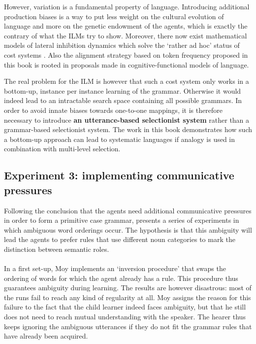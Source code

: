 However, variation is a fundamental property of language. Introducing  additional production biases is a way to put less weight on the cultural evolution of language and more on the genetic endowment of the agents, which is exactly the contrary of what the ILMs try to show. Moreover, there now exist mathematical models of lateral inhibition dynamics which solve the `rather ad hoc' status of cost systems \citep{baronchelli06sharp, devylder07evolution}. Also the alignment strategy based on token frequency proposed in this book is rooted in proposals made in cognitive-functional models of language.

The real problem for the ILM is however that such a cost system only works in a bottom-up, instance per instance learning of the grammar. Otherwise it would indeed lead to an intractable search space containing all possible grammars. In order to avoid innate biases towards one-to-one mappings, it is therefore necessary to introduce {\bfseries an utterance-based selectionist system} rather than a grammar-based selectionist system. The work in this book demonstrates how such a bottom-up approach can lead to systematic languages if analogy is used in combination with multi-level selection.

\subsection{Experiment 3: implementing communicative pressures}

Following the conclusion that the agents need additional communicative pressures in order to form a primitive case grammar, \citet[chapter 6]{moy06case} presents a series of experiments in which ambiguous word orderings occur. The hypothesis is that this ambiguity will lead the agents to prefer rules that use different noun categories to mark the distinction between semantic roles.
\\
\\
 In a first set-up, Moy implements an `inversion procedure' that swaps the ordering of words for which the agent already has a rule. This procedure thus guarantees ambiguity during learning. The results are however disastrous: most of the runs fail to reach any kind of regularity at all. Moy assigns the reason for this failure to the fact that the child learner indeed faces ambiguity, but that he still does not need to reach mutual understanding with the speaker. The hearer thus keeps ignoring the ambiguous utterances if they do not fit the grammar rules that have already been acquired.


